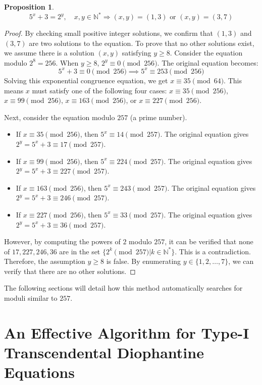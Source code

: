 \documentclass{article}
\newtheorem{proposition}[theorem]{Proposition}
\begin{document}
\begin{proposition}
\[ 5^x+3=2^y, \quad x, y \in \mathbb{N}^* \Rightarrow (x,y)=(1,3) \text{ or } (x,y)=(3,7) \]
\end{proposition}
\begin{proof}
By checking small positive integer solutions, we confirm that $(1, 3)$ and $(3, 7)$ are two solutions to the equation. To prove that no other solutions exist, we assume there is a solution $(x, y)$ satisfying $y \ge 8$.
Consider the equation modulo $2^8=256$. When $y \ge 8$, $2^y \equiv 0 \pmod{256}$. The original equation becomes:
$$ 5^x+3 \equiv 0 \pmod{256} \implies 5^x \equiv 253 \pmod{256} $$
Solving this exponential congruence equation, we get $x \equiv 35 \pmod{64}$. This means $x$ must satisfy one of the following four cases: $x \equiv 35 \pmod{256}$, $x \equiv 99 \pmod{256}$, $x \equiv 163 \pmod{256}$, or $x \equiv 227 \pmod{256}$.

Next, consider the equation modulo $257$ (a prime number).
\begin{itemize}
    \item If $x \equiv 35 \pmod{256}$, then $5^x \equiv 14 \pmod{257}$. The original equation gives $2^y = 5^x+3 \equiv 17 \pmod{257}$.
    \item If $x \equiv 99 \pmod{256}$, then $5^x \equiv 224 \pmod{257}$. The original equation gives $2^y = 5^x+3 \equiv 227 \pmod{257}$.
    \item If $x \equiv 163 \pmod{256}$, then $5^x \equiv 243 \pmod{257}$. The original equation gives $2^y = 5^x+3 \equiv 246 \pmod{257}$.
    \item If $x \equiv 227 \pmod{256}$, then $5^x \equiv 33 \pmod{257}$. The original equation gives $2^y = 5^x+3 \equiv 36 \pmod{257}$.
\end{itemize}
However, by computing the powers of $2$ modulo $257$, it can be verified that none of $17, 227, 246, 36$ are in the set $\{2^k \pmod{257} | k \in \mathbb{N}^*\}$. This is a contradiction.
Therefore, the assumption $y \ge 8$ is false. By enumerating $y \in \{1, 2, \dots, 7\}$, we can verify that there are no other solutions.
\end{proof}
The following sections will detail how this method automatically searches for moduli similar to $257$.

\section{An Effective Algorithm for Type-I Transcendental Diophantine Equations}
\label{sec:methodology}
\end{document}
